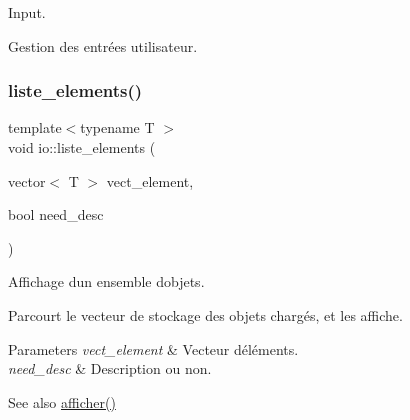 Input. 

Gestion des entrées utilisateur. \mbox{\label{namespaceio_a22b137cb32b93d8cfa7cceddf7a7e118}} 
\subsubsection{\texorpdfstring{liste\+\_\+elements()}{liste\_elements()}}
{\footnotesize\ttfamily template$<$typename T $>$ \\
void io\+::liste\+\_\+elements (\begin{DoxyParamCaption}\item[{vector$<$ T $>$}]{vect\+\_\+element,  }\item[{bool}]{need\+\_\+desc }\end{DoxyParamCaption})}



Affichage d\textquotesingle{}un ensemble d\textquotesingle{}objets. 

Parcourt le vecteur de stockage des objets chargés, et les affiche. 
\begin{DoxyParams}{Parameters}
{\em vect\+\_\+element} & Vecteur d\textquotesingle{}éléments. \\
\hline
{\em need\+\_\+desc} & Description ou non. \\
\hline
\end{DoxyParams}
\begin{DoxySeeAlso}{See also}
\hyperlink{namespaceio_a0e3593d732c42572e8b3cb09ad21c4c9}{afficher()} 
\end{DoxySeeAlso}
